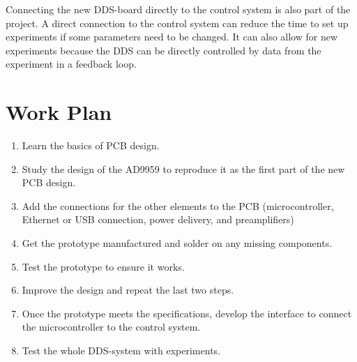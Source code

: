\documentclass[10pt]{article}
\begin{document}
Connecting the new DDS-board directly to the control system is also part of the project.
A direct connection to the control system can reduce the time to set up experiments if some parameters need to be changed.
It can also allow for new experiments because the DDS can be directly controlled by data from the experiment in a feedback loop.


\newpage

\section*{Work Plan}

\begin{enumerate}
	\item Learn the basics of PCB design.

	\item Study the design of the AD9959 to reproduce it as the first part of the new PCB design.

	\item Add the connections for the other elements to the PCB (microcontroller, Ethernet or USB connection, power delivery, and preamplifiers)

	\item Get the prototype manufactured and solder on any missing components.

	\item Test the prototype to ensure it works.

	\item Improve the design and repeat the last two steps.

	\item Once the prototype meets the specifications, develop the interface to connect the microcontroller to the control system.

	\item Test the whole DDS-system with experiments. 

\end{enumerate}

\printbibliography[heading=bibintoc,title={Bibliography}]
\end{document}
